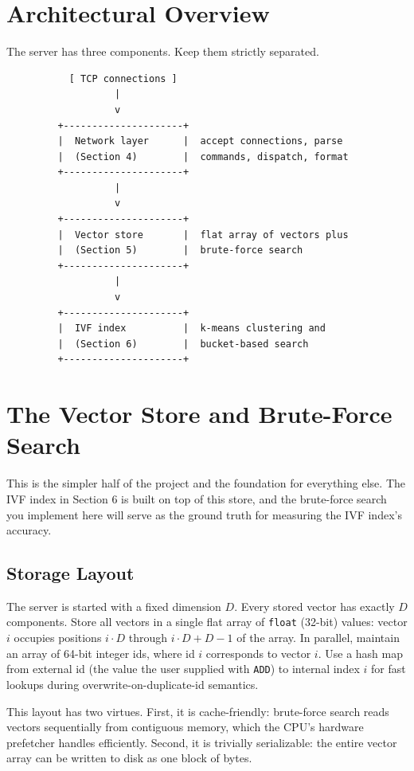 \documentclass[11pt,a4paper]{article}
\begin{document}
\section{Architectural Overview}

The server has three components. Keep them strictly separated.

\begin{codebox}
\begin{lstlisting}
           [ TCP connections ]
                   |
                   v
         +---------------------+
         |  Network layer      |  accept connections, parse
         |  (Section 4)        |  commands, dispatch, format
         +---------------------+
                   |
                   v
         +---------------------+
         |  Vector store       |  flat array of vectors plus
         |  (Section 5)        |  brute-force search
         +---------------------+
                   |
                   v
         +---------------------+
         |  IVF index          |  k-means clustering and
         |  (Section 6)        |  bucket-based search
         +---------------------+
\end{lstlisting}
\end{codebox}

\section{The Vector Store and Brute-Force Search}

This is the simpler half of the project and the foundation for everything else. The IVF index in Section 6 is built on top of this store, and the brute-force search you implement here will serve as the ground truth for measuring the IVF index's accuracy.

\subsection{Storage Layout}
The server is started with a fixed dimension $D$. Every stored vector has exactly $D$ components. Store all vectors in a single flat array of \texttt{float} (32-bit) values: vector $i$ occupies positions $i \cdot D$ through $i \cdot D + D - 1$ of the array. In parallel, maintain an array of 64-bit integer ids, where id $i$ corresponds to vector $i$. Use a hash map from external id (the value the user supplied with \texttt{ADD}) to internal index $i$ for fast lookups during overwrite-on-duplicate-id semantics.

This layout has two virtues. First, it is cache-friendly: brute-force search reads vectors sequentially from contiguous memory, which the CPU's hardware prefetcher handles efficiently. Second, it is trivially serializable: the entire vector array can be written to disk as one block of bytes.
\end{document}
